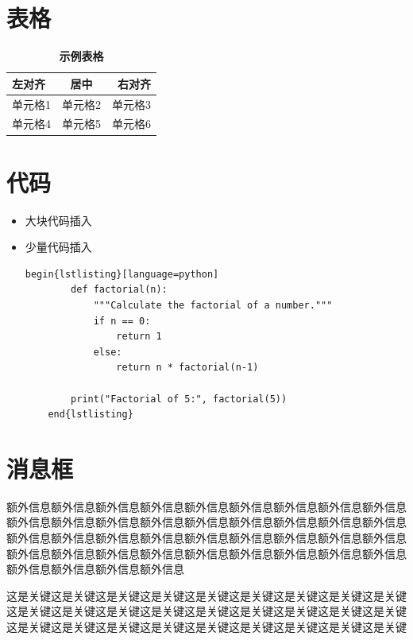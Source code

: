 \section{表格}

\begin{table}[h]
\centering
\caption{\color{maincolor} \bf 示例表格}
\begin{tabular}{|l|c|r|}
\hline
左对齐 & 居中 & 右对齐 \\ \hline
单元格1 & 单元格2 & 单元格3 \\ 
单元格4 & 单元格5 & 单元格6 \\ \hline
\end{tabular}
\label{tab:example}
\end{table}
    
\section{代码}
\begin{itemize}
    \item 大块代码插入
    
    \item 少量代码插入
    \begin{lstlisting}[language={[LaTeX]TeX}]
    begin{lstlisting}[language=python]
        def factorial(n):
            """Calculate the factorial of a number."""
            if n == 0:
                return 1
            else:
                return n * factorial(n-1)

        print("Factorial of 5:", factorial(5))        
    end{lstlisting}
    \end{lstlisting}
\end{itemize}


\section{消息框}
\begin{info}
    额外信息额外信息额外信息额外信息额外信息额外信息额外信息额外信息额外信息额外信息额外信息额外信息额外信息额外信息额外信息额外信息额外信息额外信息额外信息额外信息额外信息额外信息额外信息额外信息额外信息额外信息额外信息额外信息额外信息额外信息额外信息额外信息额外信息额外信息额外信息额外信息额外信息额外信息额外信息额外信息
\end{info}

\begin{keypoint}
    这是关键这是关键这是关键这是关键这是关键这是关键这是关键这是关键这是关键这是关键这是关键这是关键这是关键这是关键这是关键这是关键这是关键这是关键这是关键这是关键这是关键这是关键这是关键这是关键这是关键这是关键这是关键
\end{keypoint}

